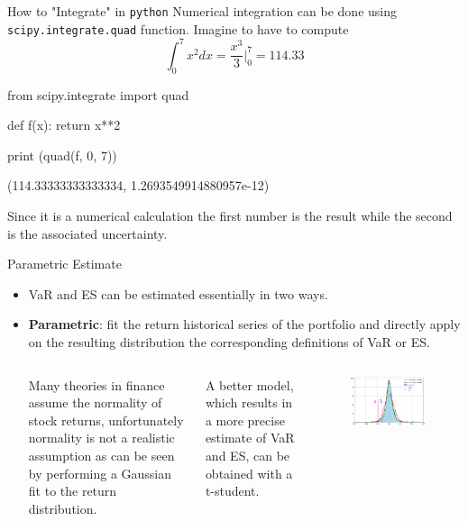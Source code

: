 \documentclass{beamer}
\begin{document}
\begin{frame}[fragile]{How to "Integrate" in \texttt{python}}
  Numerical integration can be done using \texttt{scipy.integrate.quad} function. Imagine to have to compute
  \begin{equation*}
    \int_{0}^{7} x^2 dx = \frac{x^3}{3}\bigg|_0^7 = 114.33
  \end{equation*}
  \begin{ipython}
from scipy.integrate import quad

def f(x):
  return x**2

print (quad(f, 0, 7))   
\end{ipython}
  \begin{ioutput}
(114.33333333333334, 1.2693549914880957e-12)
\end{ioutput}
Since it is a numerical calculation the first number is the result while the second is the associated uncertainty. 
\end{frame}

\begin{frame}{Parametric Estimate}
  \begin{itemize}
  \item VaR and ES can be estimated essentially in two ways.
  \item \textbf{Parametric}: fit the return historical series of the portfolio and directly apply on the resulting distribution the corresponding definitions of VaR or ES.
    \begin{columns}
      Many theories in finance assume the normality of stock returns, unfortunately normality is not a realistic assumption as can be seen by performing a Gaussian fit to the return distribution.
      
      A better model, which results in a more precise estimate of VaR and ES, can be obtained with a t-student.
      \begin{figure}[h]
        \begin{center}
          \includegraphics[width=0.9\linewidth]{parametric_var}
        \end{center}
      \end{figure}
    \end{columns}
  \end{itemize}
\end{frame}
\end{document}
